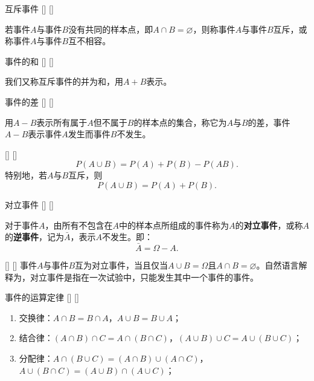 \documentclass[UTF8]{ctexart}
\begin{document}
        \begin{dfn}
            []
            {互斥事件}
            []
            []


            若事件$A$与事件$B$没有共同的样本点，即$A\cap B=\varnothing$，则称事件$A$与事件$B$互斥，或称事件$A$与事件$B$互不相容。
        \end{dfn}

        \begin{dfn}
            []
            {事件的和}
            []
            []


            我们又称互斥事件的并为和，用$A+B$表示。
        \end{dfn}

        \begin{dfn}
            []
            {事件的差}
            []
            []


            用$A-B$表示所有属于$A$但不属于$B$的样本点的集合，称它为$A$与$B$的差，事件$A-B$表示事件$A$发生而事件$B$不发生。
        \end{dfn}

        \begin{ppt}
            []
            {}
            []
            []
            \[P(A\cup B)=P(A)+P(B)-P(AB).\]
            特别地，若$A$与$B$互斥，则
            \[P(A\cup B)=P(A)+P(B).\]
        \end{ppt}

        \begin{dfn}
            []
            {对立事件}
            []
            []


            对于事件$A$，由所有不包含在$A$中的样本点所组成的事件称为$A$的\textbf{对立事件}，或称$A$的\textbf{逆事件}，记为$\bar{A}$，表示$A$不发生。即：\[\bar{A}=\Omega-A.\]
        \end{dfn}

        \begin{ppt}
            []
            {}
            []
            []
            事件$A$与事件$B$互为对立事件，当且仅当$A\cup B=\Omega$且$A\cap B=\varnothing$。自然语言解释为，对立事件是指在一次试验中，只能发生其中一个事件的事件。
        \end{ppt}

        \begin{ppt}
            []
            {事件的运算定律}
            []
            []


            \begin{enumerate}
                \item 交换律：$A\cap B=B\cap A$，$A\cup B=B\cup A$；
                \item 结合律：$(A\cap B)\cap C=A\cap(B\cap C)$，$(A\cup B)\cup C=A\cup(B\cup C)$；
                \item 分配律：$A\cap(B\cup C)=(A\cap B)\cup(A\cap C)$，$A\cup(B\cap C)=(A\cup B)\cap(A\cup C)$；
            \end{enumerate}
        \end{ppt}
\end{document}
